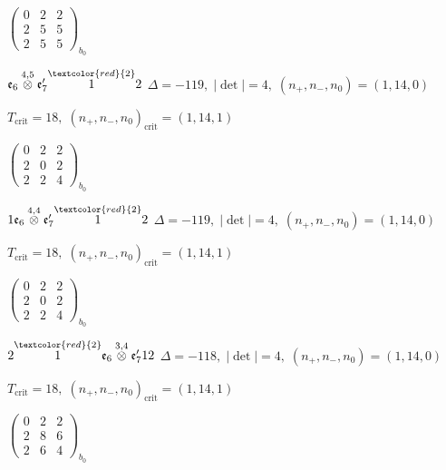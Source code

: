\documentclass[10pt]{article}
\begin{document}
\hspace{2em}$\left(\begin{smallmatrix}0 & 2 & 2 \\ 2 & 5 & 5 \\ 2 & 5 & 5\end{smallmatrix}\right)_{\!b_0}$

\smallskip

$\mathfrak{e}_6\overset{4,5}{\otimes}\mathfrak{e}_7'\overset{\textcolor{red}{2}}{1}2$ \quad $\Delta=-119,\; |\det|=4,\; (n_+,n_-,n_0)=(1,14,0)$

\hspace{1em}$T_{\text{crit}}=18,\; (n_+,n_-,n_0)_{\text{crit}}=(1,14,1)$

\hspace{2em}$\left(\begin{smallmatrix}0 & 2 & 2 \\ 2 & 0 & 2 \\ 2 & 2 & 4\end{smallmatrix}\right)_{\!b_0}$

\smallskip

$1\mathfrak{e}_6\overset{4,4}{\otimes}\mathfrak{e}_7'\overset{\textcolor{red}{2}}{1}2$ \quad $\Delta=-119,\; |\det|=4,\; (n_+,n_-,n_0)=(1,14,0)$

\hspace{1em}$T_{\text{crit}}=18,\; (n_+,n_-,n_0)_{\text{crit}}=(1,14,1)$

\hspace{2em}$\left(\begin{smallmatrix}0 & 2 & 2 \\ 2 & 0 & 2 \\ 2 & 2 & 4\end{smallmatrix}\right)_{\!b_0}$

\smallskip

$2\overset{\textcolor{red}{2}}{1}\mathfrak{e}_6\overset{3,4}{\otimes}\mathfrak{e}_7'12$ \quad $\Delta=-118,\; |\det|=4,\; (n_+,n_-,n_0)=(1,14,0)$

\hspace{1em}$T_{\text{crit}}=18,\; (n_+,n_-,n_0)_{\text{crit}}=(1,14,1)$

\hspace{2em}$\left(\begin{smallmatrix}0 & 2 & 2 \\ 2 & 8 & 6 \\ 2 & 6 & 4\end{smallmatrix}\right)_{\!b_0}$
\end{document}
